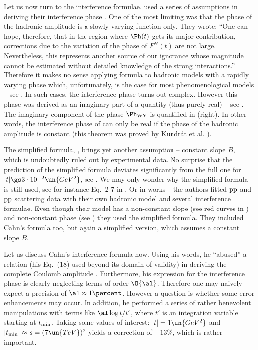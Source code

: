 Let us now turn to the interference formulae. \WaY{} used a series of assumptions in deriving their interference phase . One of the most limiting was that the phase of the hadronic amplitude is a slowly varying function only. They wrote: ``One can hope, therefore, that in the region where $\Ph(t)$ gets its major contribution, corrections due to the variation of the phase of $F^H(t)$ are not large. Nevertheless, this represents another source of our ignorance whose magnitude cannot be estimated without detailed knowledge of the strong interactions.'' Therefore it makes no sense applying \WaY{} formula to hadronic models with a rapidly varying phase which, unfortunately, is the case for most phenomenological models -- see . In such cases, the interference phase  turns out complex. However this phase was derived as an imaginary part of a quantity (thus purely real) -- see . The imaginary component of the phase $\Ph_{\rm WY}$ is quantified in  (right). In other words, the interference phase of \WaY{} can only be real if the phase of the hadronic amplitude is constant (this theorem was proved by Kundr\' at et al. ).

The simplified \WaY{} formula, , brings yet another assumption -- constant slope $B$, which is undoubtedly ruled out by experimental data. No surprise that the prediction of the simplified formula deviates significantly from the full one for $|t| \gs 3\cdot 10^{-2}\un{GeV^2}$, see . We may only wonder why the simplified formula is still used, see for instance Eq.~2-7 in    .
Or in works  -- the authors fitted $\rm pp$ and $\rm\bar pp$ scattering data with their own hadronic model and several interference formulae. Even though their model has a non-constant slope (see red curves in ) and non-constant phase (see ) they used the simplified \WY{} formula. They included Cahn's formula too, but again a simplified version, which assumes a constant slope $B$.


Let us discuss Cahn's interference formula  now. Using his words, he ``abused'' a relation (his Eq.~(18) used beyond its domain of validity) in deriving the complete Coulomb amplitude . Furthermore, his expression for the interference phase is clearly neglecting terms of order $\O{\al}$. Therefore one may naively expect a precision of $\al\approx 1\percent$. However a question is whether some error enhancements may occur. In addition, he performed a series of rather benevolent manipulations with terms like $\al \log t/ t'$, where $t'$ is an integration variable starting at $t_{\rm min}$. Taking some values of interest: $|t| = 1\un{GeV^2}$ and $|t_{\rm min}| \approx s = (7\un{TeV})^2$ yields a correction of $-13\percent$, which is rather important.


